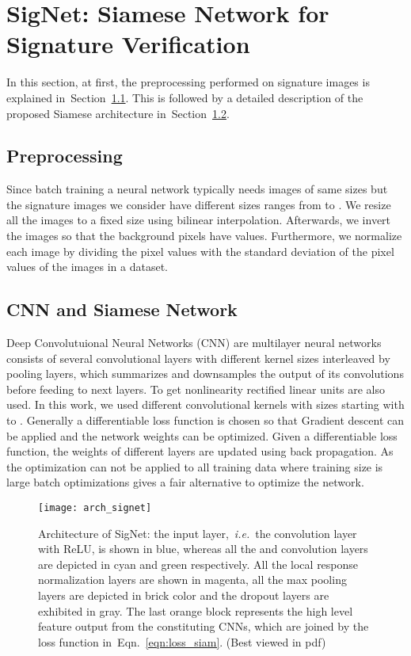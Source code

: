 \documentclass[times,twocolumn,final]{elsarticle}
\newcommand{\ie}{\textit{i.e.}}
\newcommand{\eq}[1]{Eqn.~\ref{#1}}
\newcommand{\sect}[1]{Section~\ref{#1}}
\begin{document}
 
\section{SigNet: Siamese Network for Signature Verification}
\label{s:signet}
In this section, at first, the preprocessing performed on signature images is explained in~\sect{ss:preprocessing}. This is followed by a detailed description of the proposed Siamese architecture in~\sect{ss:cnn_siamese}.


\subsection{Preprocessing}
\label{ss:preprocessing}
Since batch training a neural network typically needs images of same sizes but the signature images we consider have different sizes ranges from  to . We resize all the images to a fixed size  using bilinear interpolation. Afterwards, we invert the images so that the background pixels have  values. Furthermore, we normalize each image by dividing the pixel values with the standard deviation of the pixel values of the images in a dataset.





\subsection{CNN and Siamese Network}
\label{ss:cnn_siamese}
Deep Convolutuional Neural Networks (CNN) are multilayer neural networks consists of several convolutional layers with different kernel sizes interleaved by pooling layers, which summarizes and downsamples the output of its convolutions before feeding to next layers. To get nonlinearity rectified linear units are also used. In this work, we used different convolutional kernels with sizes starting with  to . Generally a differentiable loss function is chosen so that Gradient descent can be applied and the network weights can be optimized. Given a differentiable loss function, the weights of different layers are updated using back propagation. As the optimization can not be applied to all training data where training size is large batch optimizations gives a fair alternative to optimize the network.



\begin{figure*}
\begin{center}
\texttt{[image: arch\_signet]}
\end{center}
\caption{Architecture of SigNet: the input layer,~\ie~the  convolution layer with ReLU, is shown in blue, whereas all the  and  convolution layers are depicted in cyan and green respectively. All the local response normalization layers are shown in magenta, all the max pooling layers are depicted in brick color and the dropout layers are exhibited in gray. The last orange block represents the high level feature output from the constituting CNNs, which are joined by the loss function in~\eq{eqn:loss_siam}. (Best viewed in pdf)}
\end{figure*}
\end{document}
